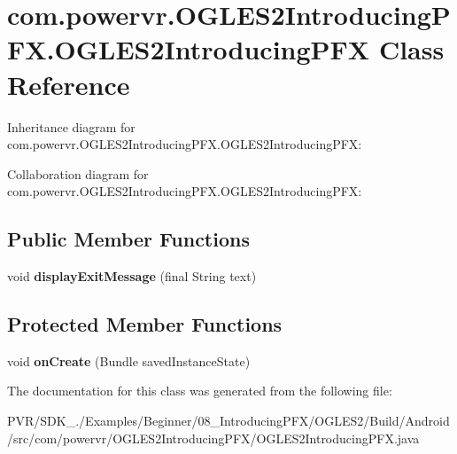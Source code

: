 \hypertarget{classcom_1_1powervr_1_1_o_g_l_e_s2_introducing_p_f_x_1_1_o_g_l_e_s2_introducing_p_f_x}{\section{com.\+powervr.\+O\+G\+L\+E\+S2\+Introducing\+P\+F\+X.\+O\+G\+L\+E\+S2\+Introducing\+P\+F\+X Class Reference}
\label{classcom_1_1powervr_1_1_o_g_l_e_s2_introducing_p_f_x_1_1_o_g_l_e_s2_introducing_p_f_x}
}


Inheritance diagram for com.\+powervr.\+O\+G\+L\+E\+S2\+Introducing\+P\+F\+X.\+O\+G\+L\+E\+S2\+Introducing\+P\+F\+X\+:


Collaboration diagram for com.\+powervr.\+O\+G\+L\+E\+S2\+Introducing\+P\+F\+X.\+O\+G\+L\+E\+S2\+Introducing\+P\+F\+X\+:
\subsection*{Public Member Functions}
\begin{DoxyCompactItemize}
\item 
\hypertarget{classcom_1_1powervr_1_1_o_g_l_e_s2_introducing_p_f_x_1_1_o_g_l_e_s2_introducing_p_f_x_a89b4649106eeba2d1670a4b383d8e5a2}{void {\bfseries display\+Exit\+Message} (final String text)}\label{classcom_1_1powervr_1_1_o_g_l_e_s2_introducing_p_f_x_1_1_o_g_l_e_s2_introducing_p_f_x_a89b4649106eeba2d1670a4b383d8e5a2}

\end{DoxyCompactItemize}
\subsection*{Protected Member Functions}
\begin{DoxyCompactItemize}
\item 
\hypertarget{classcom_1_1powervr_1_1_o_g_l_e_s2_introducing_p_f_x_1_1_o_g_l_e_s2_introducing_p_f_x_ab7cb4ae0575a90e858e8d61c273c0184}{void {\bfseries on\+Create} (Bundle saved\+Instance\+State)}\label{classcom_1_1powervr_1_1_o_g_l_e_s2_introducing_p_f_x_1_1_o_g_l_e_s2_introducing_p_f_x_ab7cb4ae0575a90e858e8d61c273c0184}

\end{DoxyCompactItemize}


The documentation for this class was generated from the following file\+:\begin{DoxyCompactItemize}
\item 
P\+V\+R/\+S\+D\+K\+\_./\+Examples/\+Beginner/08\+\_\+\+Introducing\+P\+F\+X/\+O\+G\+L\+E\+S2/\+Build/\+Android/src/com/powervr/\+O\+G\+L\+E\+S2\+Introducing\+P\+F\+X/O\+G\+L\+E\+S2\+Introducing\+P\+F\+X.\+java\end{DoxyCompactItemize}
